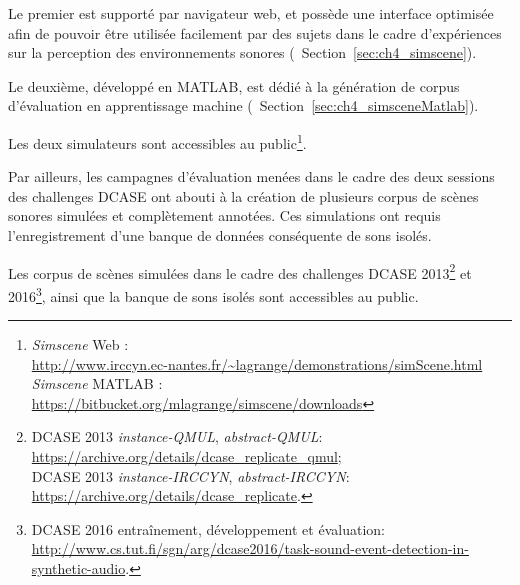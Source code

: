 Le premier est supporté par navigateur web, et possède une interface optimisée afin de pouvoir être utilisée facilement par des sujets dans le cadre d'expériences sur la perception des environnements sonores (\cf~Section~\ref{sec:ch4_simscene}).

Le deuxième, développé en MATLAB, est dédié à la génération de corpus d'évaluation en apprentissage machine (\cf~Section~\ref{sec:ch4_simsceneMatlab}).

Les deux simulateurs sont accessibles au public\footnote{\emph{Simscene} Web : \\ \url{http://www.irccyn.ec-nantes.fr/~lagrange/demonstrations/simScene.html} \\ \emph{Simscene} MATLAB : \\ \url{https://bitbucket.org/mlagrange/simscene/downloads}}.

Par ailleurs, les campagnes d'évaluation menées dans le cadre des deux sessions des challenges DCASE ont abouti à la création de plusieurs corpus de scènes sonores simulées et complètement annotées. Ces simulations ont requis l'enregistrement d'une banque de données conséquente de sons isolés.

Les corpus de scènes simulées dans le cadre des challenges DCASE 2013\footnote{DCASE 2013 \emph{instance-QMUL}, \emph{abstract-QMUL}: \\ \url{https://archive.org/details/dcase_replicate_qmul}; \\ DCASE 2013 \emph{instance-IRCCYN}, \emph{abstract-IRCCYN}: \\ \url{https://archive.org/details/dcase_replicate}.} et 2016\footnote{DCASE 2016 entraînement, développement et évaluation: \\ \url{http://www.cs.tut.fi/sgn/arg/dcase2016/task-sound-event-detection-in-synthetic-audio}.}, ainsi que la banque de sons isolés sont accessibles au public.








